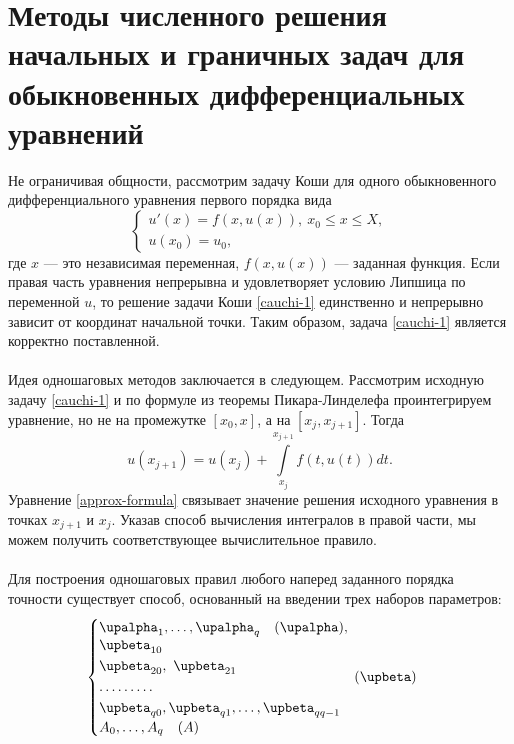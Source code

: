 \documentclass[a4paper, 12pt]{report}
\numberwithin{equation}{section}
\renewcommand{\leq}{\leqslant}
\renewcommand{\alpha}{\upalpha}
\renewcommand{\beta}{\upbeta}
\begin{document}
	\section{Методы численного решения начальных и граничных задач для обыкновенных дифференциальных уравнений}
	Не ограничивая общности, рассмотрим задачу Коши для одного обыкновенного дифференциального уравнения первого порядка вида 
	\begin{equation}
		\label{cauchi-1}
		\begin{cases}
			u'(x) = f(x, u(x)),\ x_0 \leq x \leq X,\\
			u(x_0) = u_0,
		\end{cases}
	\end{equation} где $x$ --- это независимая переменная, $f(x, u(x))$ --- заданная функция.
	Если правая часть уравнения непрерывна и удовлетворяет условию Липшица по переменной $u$, то решение задачи Коши \eqref{cauchi-1} единственно и непрерывно зависит от координат начальной точки. Таким образом, задача \eqref{cauchi-1} является корректно поставленной.
	\\\\
	Идея одношаговых методов заключается в следующем. Рассмотрим исходную задачу \eqref{cauchi-1} и по формуле из теоремы Пикара-Линделефа проинтегрируем уравнение, но не на промежутке $[x_0,x]$, а на $[x_j, x_{j+1}]$. Тогда \begin{equation}
		\label{approx-formula}
		u(x_{j+1}) = u(x_j) + \int\limits_{x_j}^{x_{j+1}}f(t, u(t))dt.
	\end{equation}
	Уравнение \eqref{approx-formula} связывает значение решения исходного уравнения в точках $x_{j+1}$ и $x_j$. Указав способ вычисления интегралов в правой части, мы можем получить соответствующее вычислительное правило.
	\\\\
	Для построения одношаговых правил любого наперед заданного порядка точности существует способ, основанный на введении трех наборов параметров:
	\begin{equation}
		\label{params}
		\begin{cases}
		\alpha_1,\ldots, \alpha_q \quad (\alpha),\\
		\begin{gathered} 
			\beta_{10} \hfill \\ 
			\beta_{20},\ \beta_{21}\hfill  \\
			\dots\dots\dots \hfill \\
			\beta_{q0}, \beta_{q1},\ldots, \beta_{qq-1} \hfill \\
		\end{gathered}\quad (\beta)\\
		A_0,\ldots, A_q \quad (A)
	\end{cases}
	\end{equation}
\end{document}

